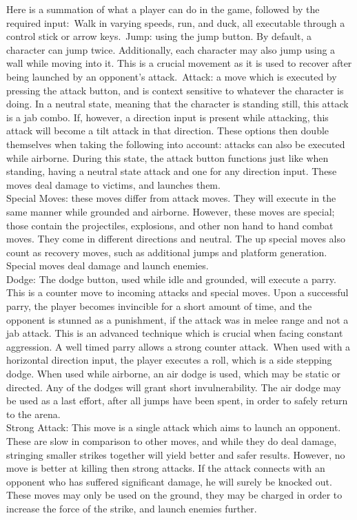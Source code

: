 \documentclass[11pt]{article}
\begin{document}
Here is a summation of what a player can do in the game, followed by the required input:\
Walk in varying speeds, run, and duck, all executable through a control stick or arrow keys.\
Jump: using the jump button. By default, a character can jump twice. Additionally, each character may also jump using a wall while moving into it. This is a crucial movement as it is used to recover after being launched by an opponent's attack.\
Attack: a move which is executed by pressing the attack button, and is context sensitive to whatever the character is doing. In a neutral state, meaning that the character is standing still, this attack is a jab combo. If, however, a direction input is present while attacking, this attack will become a tilt attack in that direction. These options then double themselves when taking the following into account: attacks can also be executed while airborne. During this state, the attack button functions just like when standing, having a neutral state attack and one for any direction input. These moves deal damage to victims, and launches them.\\
Special Moves: these moves differ from attack moves. They will execute in the same manner while grounded and airborne. However, these moves are special; those contain the projectiles, explosions, and other non hand to hand combat moves. They come in different directions and neutral. The up special moves also count as recovery moves, such as additional jumps and platform generation. Special moves deal damage and launch enemies.\\
Dodge: The dodge button, used while idle and grounded, will execute a parry. This is a counter move to incoming attacks and special moves. Upon a successful parry, the player becomes invincible for a short amount of time, and the opponent is stunned as a punishment, if the attack was in melee range and not a jab attack. This is an advanced technique which is crucial when facing constant aggression. A well timed parry allows a strong counter attack.\
When used with a horizontal direction input, the player executes a roll, which is a side stepping dodge. When used while airborne, an air dodge is used, which may be static or directed. Any of the dodges will grant short invulnerability. The air dodge may be used as a last effort, after all jumps have been spent, in order to safely return to the arena.\\
Strong Attack: This move is a single attack which aims to launch an opponent. These are slow in comparison to other moves, and while they do deal damage, stringing smaller strikes together will yield better and safer results. However, no move is better at killing then strong attacks. If the attack connects with an opponent who has suffered significant damage, he will surely be knocked out. These moves may only be used on the ground, they may be charged in order to increase the force of the strike, and launch enemies further.\\
\end{document}
